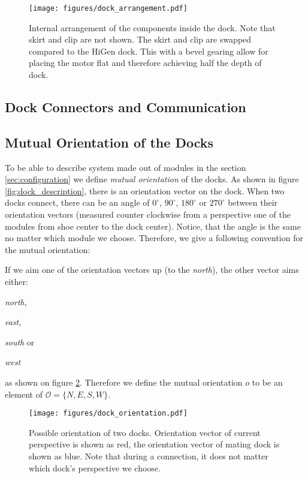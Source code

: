 \begin{figure}[h!]
    \centering
    \texttt{[image: figures/dock\_arrangement.pdf]}
    \caption{Internal arrangement of the components inside the dock. Note that
    skirt and clip are not shown. The skirt and clip are swapped compared to the
    HiGen dock. This with a bevel gearing allow for placing the motor flat and
    therefore achieving half the depth of dock.}
    \label{fig:dock_internal_arrangement}
\end{figure}

\subsection{Dock Connectors and Communication}


\subsection{Mutual Orientation of the Docks}\label{sec:mutual_orientation}

To be able to describe system made out of modules in the section
\ref{sec:configuration} we define \emph{mutual orientation} of the docks. As
shown in figure \ref{fig:dock_description}, there is an orientation vector on
the dock. When two docks connect, there can be an angle of $0^\circ$,
$90^\circ$, $180^\circ$ or $270^\circ$ between their orientation vectors
(measured counter clockwise from a perspective one of the modules from shoe
center to the dock center). Notice, that the angle is the same no matter which
module we choose. Therefore, we give a following convention for the mutual
orientation:

If we aim one of the orientation vectors up (to the \emph{north}), the other
vector aims either:
\begin{enumerate*}
    \item \emph{north},
    \item \emph{east},
    \item \emph{south} or
    \item \emph{west}
\end{enumerate*}
as shown on figure \ref{fig:dock_orientation}. Therefore we define the mutual
orientation $o$ to be an element of $\mathcal{O} = \{N, E, S, W\}$.

\begin{figure}[h!]
    \centering
    \texttt{[image: figures/dock\_orientation.pdf]}
    \caption{Possible orientation of two docks. Orientation vector of current
    perspective is shown as red, the orientation vector of mating dock is shown
    as blue. Note that during a connection, it does not matter which dock's
    perspective we choose.}
    \label{fig:dock_orientation}
\end{figure}


